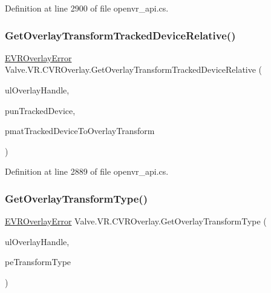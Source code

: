 Definition at line 2900 of file openvr\+\_\+api.\+cs.

\mbox{\label{class_valve_1_1_v_r_1_1_c_v_r_overlay_ad9de7c6f37c6d0102e0f1239e57a94db}} 
\subsubsection{\texorpdfstring{GetOverlayTransformTrackedDeviceRelative()}{GetOverlayTransformTrackedDeviceRelative()}}
{\footnotesize\ttfamily \mbox{\hyperlink{namespace_valve_1_1_v_r_aaee5c5144f42b7969d45b854f51b0c18}{E\+V\+R\+Overlay\+Error}} Valve.\+V\+R.\+C\+V\+R\+Overlay.\+Get\+Overlay\+Transform\+Tracked\+Device\+Relative (\begin{DoxyParamCaption}\item[{ulong}]{ul\+Overlay\+Handle,  }\item[{ref uint}]{pun\+Tracked\+Device,  }\item[{ref \mbox{\hyperlink{struct_valve_1_1_v_r_1_1_hmd_matrix34__t}{Hmd\+Matrix34\+\_\+t}}}]{pmat\+Tracked\+Device\+To\+Overlay\+Transform }\end{DoxyParamCaption})}



Definition at line 2889 of file openvr\+\_\+api.\+cs.

\mbox{\label{class_valve_1_1_v_r_1_1_c_v_r_overlay_aa02ca92f757e30beca7ac9ded8f6472a}} 
\subsubsection{\texorpdfstring{GetOverlayTransformType()}{GetOverlayTransformType()}}
{\footnotesize\ttfamily \mbox{\hyperlink{namespace_valve_1_1_v_r_aaee5c5144f42b7969d45b854f51b0c18}{E\+V\+R\+Overlay\+Error}} Valve.\+V\+R.\+C\+V\+R\+Overlay.\+Get\+Overlay\+Transform\+Type (\begin{DoxyParamCaption}\item[{ulong}]{ul\+Overlay\+Handle,  }\item[{ref \mbox{\hyperlink{namespace_valve_1_1_v_r_a92803c040c9ae49e1263b22b4d57d5fb}{V\+R\+Overlay\+Transform\+Type}}}]{pe\+Transform\+Type }\end{DoxyParamCaption})}



